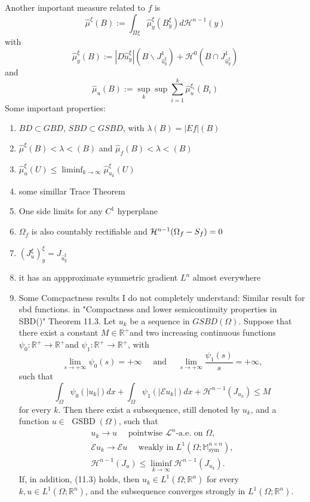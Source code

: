 Another important measure related to $f$ is $$\hat{\mu}^{\xi}(B):=\int_{\Pi \xi} \hat{\mu}_y^{\xi}\left(B_y^{\xi}\right) d \mathcal{H}^{n-1}(y)$$
with
$$\hat{\mu}_y^{\xi}(B):=\left|D \hat{u}_y^{\xi}\right|\left(B \backslash J_{\hat{u}_y^{\xi}}^1\right)+\mathcal{H}^0\left(B \cap J_{\hat{u}_y^{\xi}}^1\right)$$
and
$$\hat{\mu}_u(B):=\sup _k \sup \sum_{i=1}^k \hat{\mu}_u^{\xi_i}\left(B_i\right)$$
Some important properties:
\begin{enumerate}
    \item $BD\subset GBD$, $SBD\subset GSBD$, with $\lambda(B)= |Ef|(B)$
    \item $\hat{\mu}^{\xi}(B)<\lambda<(B)$ and $\hat{\mu}_{f}(B)<\lambda<(B)$
    \item $\hat{\mu}_u^{\xi}(U) \leq \liminf _{k \rightarrow \infty} \hat{\mu}_{u_k}^{\xi}(U)$
    \item some simillar Trace Theorem
    \item One side limits for any $C^1$ hyperplane
    \item $\Omega_f$ is also countably rectifiable and ${\mathcal H}^{n-1}(\Omega_f-S_f)=0$
    \item $\left(J_u^{\xi}\right)_y^{\xi}=J_{\hat{u}_y^{\xi}}$
    \item it has an appproximate symmetric gradient $L^n$ almost everywhere
    \item Some Comcpactness results I do not completely understand:  Similar result  for sbd functions. in "Compactness and lower semicontinuity properties
in SBD()"
    Theorem 11.3. Let $u_k$ be a sequence in $G S B D(\Omega)$. Suppose that there exist a constant $M \in \mathbb{R}^{+}$and two increasing continuous functions $\psi_0: \mathbb{R}^{+} \rightarrow \mathbb{R}^{+}$and $\psi_1: \mathbb{R}^{+} \rightarrow \mathbb{R}^{+}$, with
$$
\lim _{s \rightarrow+\infty} \psi_0(s)=+\infty \quad \text { and } \quad \lim _{s \rightarrow+\infty} \frac{\psi_1(s)}{s}=+\infty,
$$
such that
$$
\int_{\Omega} \psi_0\left(\left|u_k\right|\right) d x+\int_{\Omega} \psi_1\left(\left|\mathcal{E} u_k\right|\right) d x+\mathcal{H}^{n-1}\left(J_{u_k}\right) \leq M
$$
for every $k$. Then there exist a subsequence, still denoted by $u_k$, and a function $u \in$ $\operatorname{GSBD}(\Omega)$, such that
$$
\begin{gathered}
u_k \rightarrow u \quad \text { pointwise } \mathcal{L}^n \text {-a.e. on } \Omega, \\
\mathcal{E} u_k \rightarrow \mathcal{E} u \quad \text { weakly in } L^1\left(\Omega ; \mathbb{M}_{\text {sym }}^{n \times n}\right), \\
\mathcal{H}^{n-1}\left(J_u\right) \leq \liminf _{k \rightarrow \infty} \mathcal{H}^{n-1}\left(J_{u_k}\right) .
\end{gathered}
$$
If, in addition, (11.3) holds, then $u_k \in L^1\left(\Omega ; \mathbb{R}^n\right)$ for every $k, u \in L^1\left(\Omega ; \mathbb{R}^n\right)$, and the subsequence converges strongly in $L^1\left(\Omega ; \mathbb{R}^n\right)$.
\end{enumerate}

